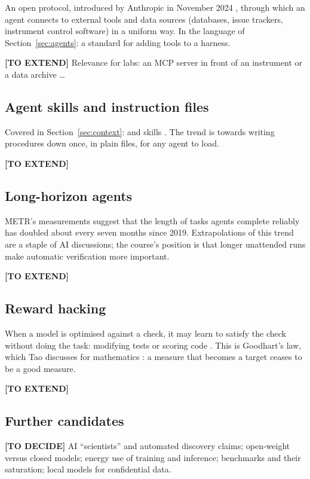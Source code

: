 An open protocol, introduced by Anthropic in November 2024 , through which an
agent connects to external tools and data sources (databases, issue trackers, instrument
control software) in a uniform way. In the language of Section~\ref{sec:agents}: a
standard for adding tools to a harness.

\textbf{[TO EXTEND]} Relevance for labs: an MCP server in front of an instrument or a
data archive \dots

\subsection{Agent skills and instruction files}

Covered in Section~\ref{sec:context}:   and skills
. The trend is towards writing procedures down once, in plain files, for any
agent to load.

\textbf{[TO EXTEND]}

\subsection{Long-horizon agents}

METR's measurements  suggest that the length of tasks agents complete
reliably has doubled about every seven months since 2019. Extrapolations of this trend
are a staple of AI discussions; the course's position is that longer unattended runs make
automatic verification more important.

\textbf{[TO EXTEND]}

\subsection{Reward hacking}

When a model is optimised against a check, it may learn to satisfy the check without
doing the task: modifying tests or scoring code . This is Goodhart's law,
which Tao discusses for mathematics : a measure that becomes a target ceases to be
a good measure.

\textbf{[TO EXTEND]}

\subsection{Further candidates}

\textbf{[TO DECIDE]} AI ``scientists'' and automated discovery claims; open-weight versus
closed models; energy use of training and inference; benchmarks and their saturation;
local models for confidential data.
